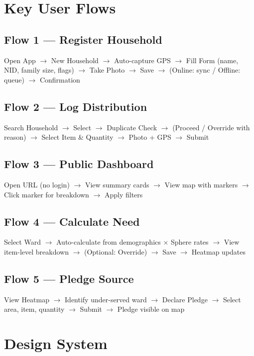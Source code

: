 \section{Key User Flows}

\subsection{Flow 1 --- Register Household}
Open App $\rightarrow$ New Household $\rightarrow$ Auto-capture GPS $\rightarrow$ Fill Form (name, NID, family size, flags) $\rightarrow$ Take Photo $\rightarrow$ Save $\rightarrow$ (Online: sync / Offline: queue) $\rightarrow$ Confirmation

\subsection{Flow 2 --- Log Distribution}
Search Household $\rightarrow$ Select $\rightarrow$ Duplicate Check $\rightarrow$ (Proceed / Override with reason) $\rightarrow$ Select Item \& Quantity $\rightarrow$ Photo + GPS $\rightarrow$ Submit

\subsection{Flow 3 --- Public Dashboard}
Open URL (no login) $\rightarrow$ View summary cards $\rightarrow$ View map with markers $\rightarrow$ Click marker for breakdown $\rightarrow$ Apply filters

\subsection{Flow 4 --- Calculate Need}
Select Ward $\rightarrow$ Auto-calculate from demographics $\times$ Sphere rates $\rightarrow$ View item-level breakdown $\rightarrow$ (Optional: Override) $\rightarrow$ Save $\rightarrow$ Heatmap updates

\subsection{Flow 5 --- Pledge Source}
View Heatmap $\rightarrow$ Identify under-served ward $\rightarrow$ Declare Pledge $\rightarrow$ Select area, item, quantity $\rightarrow$ Submit $\rightarrow$ Pledge visible on map

\section{Design System}

